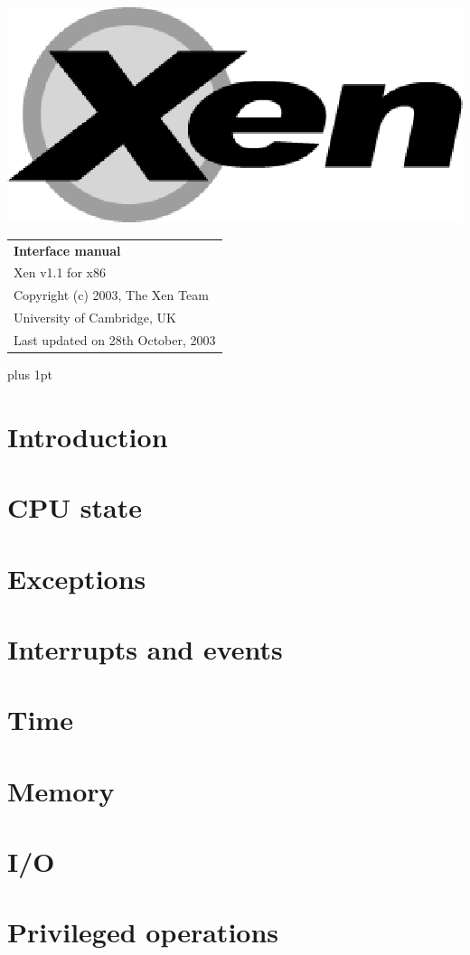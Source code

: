 \documentclass[11pt,twoside,final,openright]{xenstyle}
\begin{document}
\pagestyle{empty}
\begin{center}
\vspace*{\fill}
\includegraphics{eps/xenlogo.eps}
\vfill
\vfill
\vfill
\begin{tabular}{l}
{\Huge \bf Interface manual} \\[4mm]
{\huge Xen v1.1 for x86} \\[80mm]
{\Large Copyright (c) 2003, The Xen Team} \\[3mm]
{\Large University of Cambridge, UK} \\[20mm]
{\large Last updated on 28th October, 2003}
\end{tabular}
\vfill
\end{center}
\cleardoublepage

\pagestyle{plain}
{ \parskip 0pt plus 1pt
  \tableofcontents }
\cleardoublepage

\raggedbottom
{}
\parindent=0pt
\renewcommand{\topfraction}{.8}
\renewcommand{\bottomfraction}{.8}
\renewcommand{\textfraction}{.2}
\renewcommand{\floatpagefraction}{.8}

\chapter{Introduction}

\chapter{CPU state}

\chapter{Exceptions}

\chapter{Interrupts and events}

\chapter{Time}

\chapter{Memory}

\chapter{I/O}

\chapter{Privileged operations}
\end{document}
